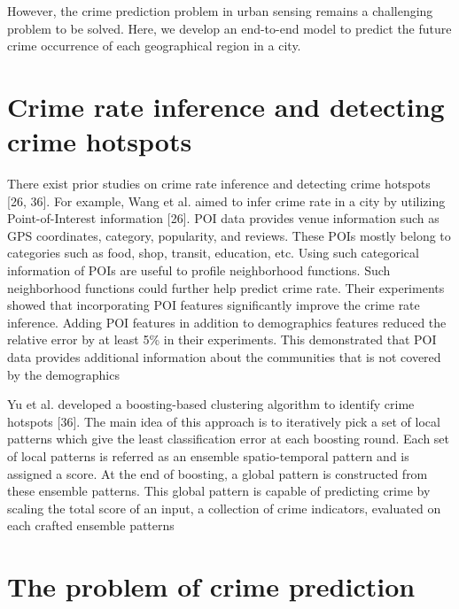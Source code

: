 \noindent However, the crime prediction problem in urban sensing remains a challenging problem to be solved. Here, we develop an end-to-end model to predict the future crime occurrence of each geographical region in a city.

\section{Crime rate inference and detecting crime hotspots}
There exist prior studies on crime rate inference and detecting crime hotspots [26, 36]. For example, Wang et al. aimed to
infer crime rate in a city by utilizing Point-of-Interest information [26]. 
POI data provides venue information such as GPS coordinates, category, popularity, and reviews. These POIs mostly belong to categories such as food, shop, transit, education, etc. 
Using such categorical information of POIs are useful to profile neighborhood functions. Such neighborhood functions could further help predict crime rate. Their experiments showed that incorporating POI features significantly improve the crime rate inference. Adding
POI features in addition to demographics features reduced the relative error by at least 5\% in their experiments. This demonstrated that POI data provides additional information about the communities that is not covered by the demographics

\noindent Yu et al. developed a boosting-based clustering algorithm
to identify crime hotspots [36]. The main idea of this approach is
to iteratively pick a set of local patterns which give the least classification error
at each boosting round. Each set of local patterns is referred as an ensemble
spatio-temporal pattern and is assigned a score. At the end of boosting, a global pattern is constructed from these ensemble patterns. This global pattern is capable of predicting crime by scaling the total score of an input, a collection of crime indicators, evaluated on each
crafted ensemble patterns 

\section{The problem of crime prediction}

